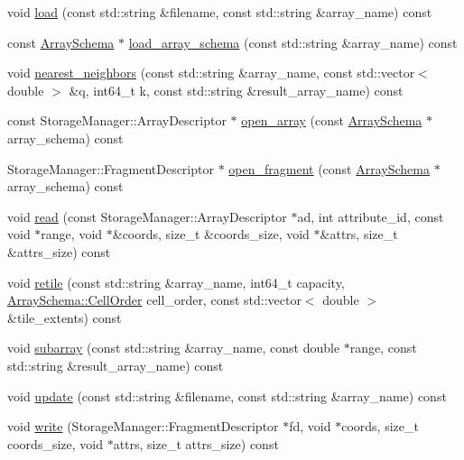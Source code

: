 \begin{DoxyCompactItemize}
\item 
void \hyperlink{classExecutor_ac34a362db8c55b14a6b71424f18467d2}{load} (const std\+::string \&filename, const std\+::string \&array\+\_\+name) const 
\item 
const \hyperlink{classArraySchema}{Array\+Schema} $\ast$ \hyperlink{classExecutor_a0cda8766b3b5d866816b30d85a6b138f}{load\+\_\+array\+\_\+schema} (const std\+::string \&array\+\_\+name) const 
\item 
void \hyperlink{classExecutor_ad3f20edeb99f4e8fbd8e78a05293d17f}{nearest\+\_\+neighbors} (const std\+::string \&array\+\_\+name, const std\+::vector$<$ double $>$ \&q, int64\+\_\+t k, const std\+::string \&result\+\_\+array\+\_\+name) const 
\item 
const Storage\+Manager\+::\+Array\+Descriptor $\ast$ \hyperlink{classExecutor_a905abc2da523e6a765c80739c1e64eaf}{open\+\_\+array} (const \hyperlink{classArraySchema}{Array\+Schema} $\ast$array\+\_\+schema) const 
\item 
Storage\+Manager\+::\+Fragment\+Descriptor $\ast$ \hyperlink{classExecutor_ab72b90048461a0a224ddc704e0aa23bd}{open\+\_\+fragment} (const \hyperlink{classArraySchema}{Array\+Schema} $\ast$array\+\_\+schema) const 
\item 
void \hyperlink{classExecutor_a85565a2aa21cfd832bf5f8ad0be7026a}{read} (const Storage\+Manager\+::\+Array\+Descriptor $\ast$ad, int attribute\+\_\+id, const void $\ast$range, void $\ast$\&coords, size\+\_\+t \&coords\+\_\+size, void $\ast$\&attrs, size\+\_\+t \&attrs\+\_\+size) const 
\item 
void \hyperlink{classExecutor_ac7406e279c2fbdd1f6b4a8c1e9aeed61}{retile} (const std\+::string \&array\+\_\+name, int64\+\_\+t capacity, \hyperlink{classArraySchema_a847601130253f905337b5e284e1b78f2}{Array\+Schema\+::\+Cell\+Order} cell\+\_\+order, const std\+::vector$<$ double $>$ \&tile\+\_\+extents) const 
\item 
void \hyperlink{classExecutor_a6b14f1a0748cc2950eb300b45419f6b6}{subarray} (const std\+::string \&array\+\_\+name, const double $\ast$range, const std\+::string \&result\+\_\+array\+\_\+name) const 
\item 
void \hyperlink{classExecutor_adae147e4a5668cdfbcefecccdae19334}{update} (const std\+::string \&filename, const std\+::string \&array\+\_\+name) const 
\item 
void \hyperlink{classExecutor_ad4a7f583b63cebbe2a4b056562006633}{write} (Storage\+Manager\+::\+Fragment\+Descriptor $\ast$fd, void $\ast$coords, size\+\_\+t coords\+\_\+size, void $\ast$attrs, size\+\_\+t attrs\+\_\+size) const 
\end{DoxyCompactItemize}
